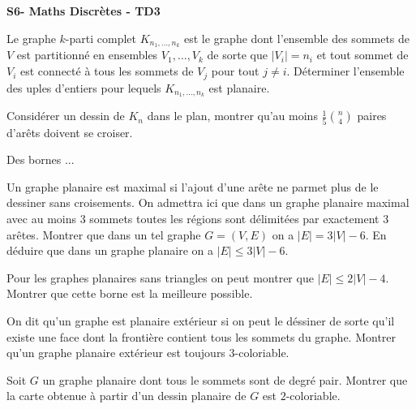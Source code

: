 \documentclass[french]{report}
\begin{document}
\begin{center}
    \huge{\textbf{S6- Maths Discrètes - TD3}}
\end{center}

\begin{exo}
    Le graphe \(k\)-parti complet \(K_{n_1,\dots,n_k}\) est le graphe dont l'ensemble
    des sommets de \(V\) est partitionné en ensembles \(V_1,\dots,V_k\) de sorte que
    \(|V_i|=n_i\) et tout sommet de \(V_i\) est connecté à tous les sommets
    de \(V_j\) pour tout \(j\neq i\). Déterminer l'ensemble des uples d'entiers
    pour lequels \(K_{n_1,\dots,n_k}\) est planaire.
\end{exo}

\begin{exo}
    Considérer un dessin de \(K_n\) dans le plan, montrer qu'au moins
    \(\frac15\binom{n}{4}\) paires d'arêts doivent se croiser.
\end{exo}

\begin{exo}
    Des bornes ...
    \begin{q}{1}
        Un graphe planaire est maximal si l'ajout d'une arête ne parmet plus de le
        dessiner sans croisements. On admettra ici que dans un graphe planaire maximal
        avec au moins 3 sommets toutes les régions sont délimitées par exactement 3
        arêtes. Montrer que dans un tel graphe \(G=(V,E)\) on a \(|E|=3|V|-6\).
        En déduire que dans un graphe planaire on a \(|E|\leq 3|V|-6\).
    \end{q}
    \begin{q}{2}
        Pour les graphes planaires sans triangles on peut montrer que \(|E|\leq 2|V|-4\).
        Montrer que cette borne est la meilleure possible.
    \end{q}
\end{exo}

\begin{exo}
    On dit qu'un graphe est planaire extérieur si on peut le déssiner de sorte qu'il
    existe une face dont la frontière contient tous les sommets du graphe. Montrer qu'un
    graphe planaire extérieur est toujours \(3\)-coloriable.
\end{exo}

\begin{exo}
    Soit \(G\) un graphe planaire dont tous le sommets sont de degré pair. Montrer que
    la carte obtenue à partir d'un dessin planaire de \(G\) est \(2\)-coloriable.
\end{exo}
\end{document}
